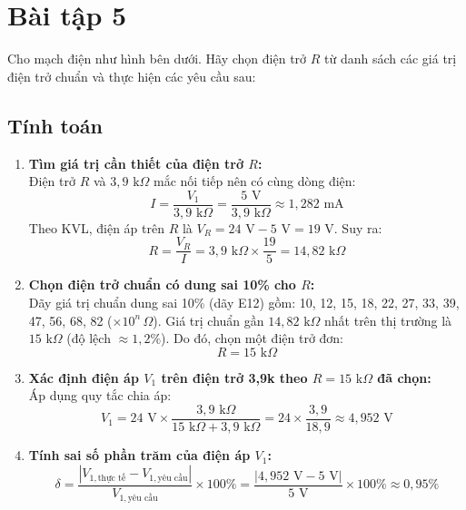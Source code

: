 \section{Bài tập 5}

Cho mạch điện như hình bên dưới. Hãy chọn điện trở $R$ từ danh sách các giá trị điện trở chuẩn và thực hiện các yêu cầu sau:


\subsection{Tính toán}
\begin{enumerate}[label=\alph*.]
  \item \textbf{Tìm giá trị cần thiết của điện trở $R$:} \\
        Điện trở $R$ và $3{,}9\text{ k}\Omega$ mắc nối tiếp nên có cùng dòng điện:
        \[
        I = \frac{V_1}{3{,}9\text{ k}\Omega} = \frac{5\text{ V}}{3{,}9\text{ k}\Omega} \approx 1{,}282\text{ mA}
        \]
        Theo KVL, điện áp trên $R$ là $V_R = 24\text{ V} - 5\text{ V} = 19\text{ V}$. Suy ra:
        \[
        R = \frac{V_R}{I} = 3{,}9\text{ k}\Omega \times \frac{19}{5} = 14{,}82\text{ k}\Omega
        \]

  \item \textbf{Chọn điện trở chuẩn có dung sai 10\% cho $R$:} \\
        Dãy giá trị chuẩn dung sai 10\% (dãy E12) gồm: 10, 12, 15, 18, 22, 27, 33, 39, 47, 56, 68, 82 ($\times 10^n\,\Omega$).
        Giá trị chuẩn gần $14{,}82\text{ k}\Omega$ nhất trên thị trường là $15\text{ k}\Omega$ (độ lệch $\approx 1{,}2\%$).
        Do đó, chọn một điện trở đơn:
        \[
        R = 15\text{ k}\Omega
        \]

  \item \textbf{Xác định điện áp $V_1$ trên điện trở 3,9k theo $R = 15\text{ k}\Omega$ đã chọn:} \\
        Áp dụng quy tắc chia áp:
        \[
        V_1 = 24\text{ V} \times \frac{3{,}9\text{ k}\Omega}{15\text{ k}\Omega + 3{,}9\text{ k}\Omega} = 24 \times \frac{3{,}9}{18{,}9} \approx 4{,}952\text{ V}
        \]

  \item \textbf{Tính sai số phần trăm của điện áp $V_1$:} \\
        \[
        \delta = \frac{|V_{1,\text{thực tế}} - V_{1,\text{yêu cầu}}|}{V_{1,\text{yêu cầu}}} \times 100\% = \frac{|4{,}952\text{ V} - 5\text{ V}|}{5\text{ V}} \times 100\% \approx 0{,}95\%
        \]


\end{enumerate}
